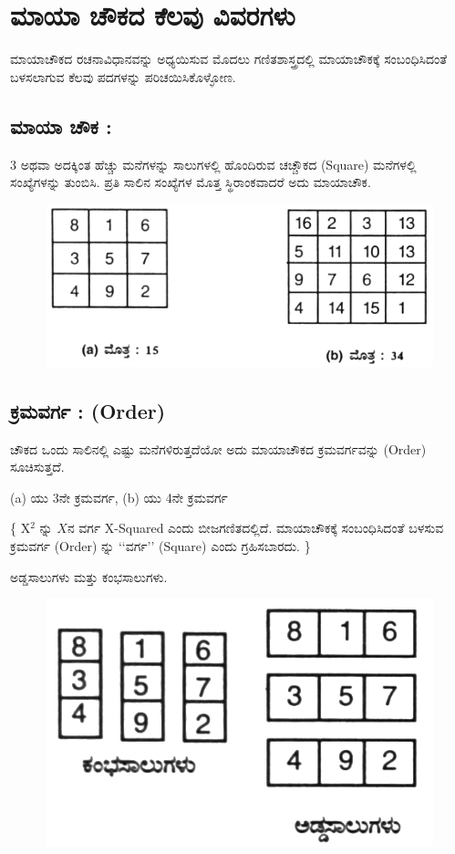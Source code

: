 \chapter{ಮಾಯಾ ಚೌಕದ ಕೆಲವು ವಿವರಗಳು}

ಮಾಯಾಚೌಕದ ರಚನಾವಿಧಾನವನ್ನು ಅಧ್ಯಯಿಸುವ ಮೊದಲು ಗಣಿತಶಾಸ್ತ್ರದಲ್ಲಿ ಮಾಯಾಚೌಕಕ್ಕೆ ಸಂಬಂಧಿಸಿದಂತೆ ಬಳಸಲಾಗುವ ಕೆಲವು ಪದಗಳನ್ನು ಪರಿಚಯಿಸಿಕೊಳ್ಳೋಣ.

\section*{ಮಾಯಾ ಚೌಕ :}

3 ಅಥವಾ ಅದಕ್ಕಿಂತ ಹೆಚ್ಚು ಮನೆಗಳನ್ನು ಸಾಲುಗಳಲ್ಲಿ ಹೊಂದಿರುವ ಚಚ್ಚೌಕದ (Square) ಮನೆಗಳಲ್ಲಿ ಸಂಖ್ಯೆಗಳನ್ನು ತುಂಬಿಸಿ. ಪ್ರತಿ ಸಾಲಿನ ಸಂಖ್ಯೆಗಳ ಮೊತ್ತ ಸ್ಥಿರಾಂಕವಾದರೆ ಅದು ಮಾಯಾಚೌಕ.
\begin{figure}[H]
\includegraphics[scale=.8]{src/figures/chap2/fig2-1.jpg}
\end{figure}

\section*{ಕ್ರಮವರ್ಗ : (Order)}

ಚೌಕದ ಒಂದು ಸಾಲಿನಲ್ಲಿ ಎಷ್ಟು ಮನೆಗಳಿರುತ್ತದೆಯೋ ಅದು ಮಾಯಾಚೌಕದ ಕ್ರಮವರ್ಗವನ್ನು (Order) ಸೂಚಿಸುತ್ತದೆ.

(a) ಯು 3ನೇ ಕ್ರಮವರ್ಗ, (b) ಯು 4ನೇ ಕ್ರಮವರ್ಗ

\{ X$^2$ ನ್ನು $X$ನ ವರ್ಗ  X-Squared ಎಂದು ಬೀಜಗಣಿತದಲ್ಲಿದೆ. ಮಾಯಾಚೌಕಕ್ಕೆ ಸಂಬಂಧಿಸಿದಂತೆ ಬಳಸುವ ಕ್ರಮವರ್ಗ (Order) ನ್ನು ‘‘ವರ್ಗ’’ (Square) ಎಂದು ಗ್ರಹಿಸಬಾರದು. \}

ಅಡ್ಡಸಾಲುಗಳು ಮತ್ತು ಕಂಭಸಾಲುಗಳು.
\begin{figure}[H]
\includegraphics[scale=.8]{src/figures/chap2/fig2-2.jpg}
\end{figure}

